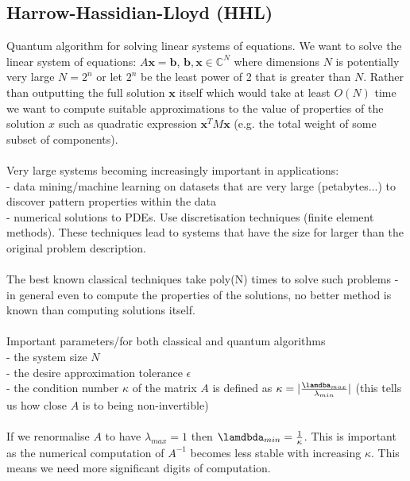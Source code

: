 \documentclass{article}
\begin{document}
\subsection{Harrow-Hassidian-Lloyd (HHL)}
Quantum algorithm for solving linear systems of equations. We want to solve the linear system of equations: $A\bm x = \bm b$, $\bm b, \bm x \in \mathbb{C}^N$ where dimensions $N$ is potentially very large $N=2^n$ or let $2^n$ be the least power of 2 that is greater than $N$. Rather than outputting the full solution $\bm x$ itself which would take at least $O(N)$ time we want to compute suitable approximations to the value of properties of the solution $x$ such as quadratic expression $\bm x^TM \bm x$ (e.g. the total weight of some subset of components).\\\\
Very large systems becoming increasingly important in applications:\\
- data mining/machine learning on datasets that are very large (petabytes...) to discover pattern properties within the data\\
- numerical solutions to PDEs. Use discretisation techniques (finite element methods). These techniques lead to systems that have the size for larger than the original problem description. \\\\
The best known classical techniques take poly(N) times to solve such problems - in general even to compute the properties of the solutions, no better method is known than computing solutions itself. \\\\
Important parameters/for both classical and quantum algorithms\\
- the system size $N$\\
- the desire approximation tolerance $\epsilon$\\
- the condition number $\kappa$ of the matrix $A$ is defined as $\kappa = | \frac{\lamdba_{max}}{\lambda_{min}}|$ (this tells us how close $A$ is to being non-invertible)\\\\
If we renormalise $A$ to have $\lambda_{max} =1$ then $\lamdbda_{min} = \frac{1}{\kappa}$. This is important as the numerical computation of $A^{-1}$ becomes less stable with increasing $\kappa$. This means we need more significant digits of computation.
\end{document}
